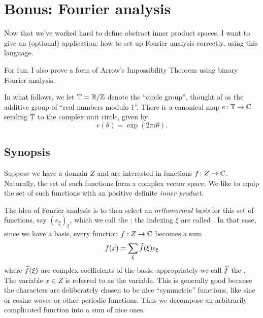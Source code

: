 \chapter{Bonus: Fourier analysis}
\label{ch:fourier}
Now that we've worked hard to define abstract inner product spaces,
I want to give an (optional) application:
how to set up Fourier analysis correctly, using this language.

For fun, I also prove a form of Arrow's Impossibility Theorem
using binary Fourier analysis.

In what follows, we let $\mathbb T = \mathbb R/\mathbb Z$ denote the ``circle group'',
thought of as the additive group of ``real numbers modulo $1$''.
There is a canonical map $e \colon \mathbb T \to \mathbb C$ sending $\mathbb T$ to the
complex unit circle, given by
\[ e(\theta) = \exp(2\pi i \theta). \]

\section{Synopsis}
Suppose we have a domain $Z$ and are interested in functions $f \colon Z \to \mathbb C$.
Naturally, the set of such functions form a complex vector space.
We like to equip the set of such functions
with an positive definite \emph{inner product}.

The idea of Fourier analysis is to then select an \emph{orthonormal basis}
for this set of functions, say $(e_\xi)_{\xi}$,
which we call the ;
the indexing $\xi$ are called .
In that case, since we have a basis, every function $f : Z \to \mathbb C$
becomes a sum
\[ f(x) = \sum_{\xi} \widehat f(\xi) e_\xi \]
where $\widehat f(\xi)$ are complex coefficients of the basis;
appropriately we call $\widehat f$ the .
The variable $x \in Z$ is referred to as the  variable.
This is generally good because the characters are deliberately chosen
to be nice ``symmetric'' functions,
like sine or cosine waves or other periodic functions.
Thus we decompose an arbitrarily complicated function into a sum of nice ones.

